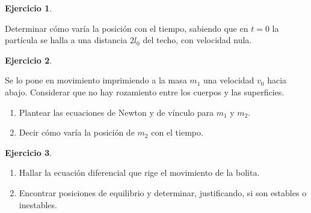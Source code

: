 \documentclass[a4paper,12pt,twoside]{book}
\newtheorem{ejercicio}{{Ejercicio}}[chapter]
\begin{document}
\begin{mdframed}[style=ejercicio-intermedio]
    \begin{ejercicio}
    \end{ejercicio}
    Determinar cómo varía la posición con el tiempo, sabiendo que en $t = 0$ la partícula se halla a una distancia $2l_0$ del techo, con velocidad nula.
\end{mdframed}

\begin{mdframed}[style=ejercicio-intermedio]
    \begin{ejercicio}
    \end{ejercicio}
    \begin{center}
        \def\svgwidth{0.6\linewidth}
        
    \end{center}
    Se lo pone en movimiento imprimiendo a la masa $m_1$ una velocidad $v_0$ hacia abajo.
    Considerar que no hay rozamiento entre los cuerpos y las superficies.
    \begin{enumerate}
        \item Plantear las ecuaciones de Newton y de vínculo para $m_1$ y $m_2$.
        \item Decir cómo varía la posición de $m_2$ con el tiempo.
    \end{enumerate}
\end{mdframed}

\begin{mdframed}[style=ejercicio-intermedio]
    \begin{ejercicio}
    \end{ejercicio}
    \begin{center}
        \def\svgwidth{0.5\linewidth}
        
    \end{center}
    \begin{enumerate}
        \item Hallar la ecuación diferencial que rige el movimiento de la bolita.
        \item Encontrar posiciones de equilibrio y determinar, justificando, si son estables o inestables.
    \end{enumerate}
\end{mdframed}
\end{document}
